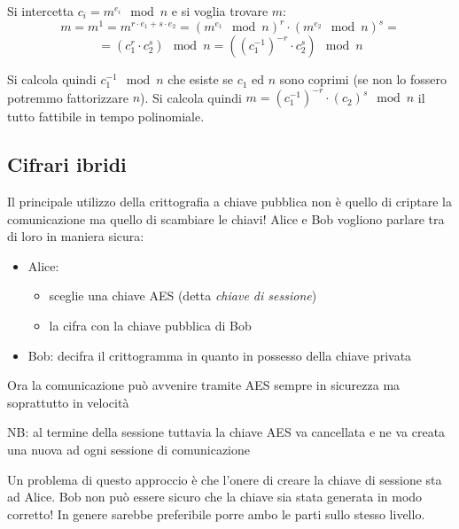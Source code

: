 Si intercetta $c_i = m^{e_i} \mod n$ e si voglia trovare $m$:
$$ m = m^1 = m^{r \cdot e_1 + s \cdot e_2 } = (m^{e_1} \mod n)^{r} \cdot (m^{e_2} \mod n)^{s} = $$
$$ = (c_1^r \cdot c_2^s) \mod n = ((c_1^{-1})^{-r} \cdot c_2^s) \mod n $$

Si calcola quindi $c_1^{-1} \mod n$ che esiste se $c_1$ ed $n$ sono coprimi (se non lo fossero potremmo fattorizzare $n$). Si calcola quindi $m = (c_1^{-1})^{-r} \cdot (c_2)^{s} \mod n$ il tutto fattibile in tempo polinomiale.

\subsection{Cifrari ibridi}
Il principale utilizzo della crittografia a chiave pubblica non è quello di criptare la comunicazione ma quello di scambiare le chiavi! Alice e Bob vogliono parlare tra di loro in maniera sicura:
\begin{itemize}
    \item Alice: 
    \begin{itemize}
        \item sceglie una chiave AES (detta \emph{chiave di sessione})
        \item la cifra con la chiave pubblica di Bob
    \end{itemize}
    \item Bob: decifra il crittogramma in quanto in possesso della chiave privata
\end{itemize}
Ora la comunicazione può avvenire tramite AES sempre in sicurezza ma soprattutto in velocità

NB: al termine della sessione tuttavia la chiave AES va cancellata e ne va creata una nuova ad ogni sessione di comunicazione

Un problema di questo approccio è che l'onere di creare la chiave di sessione sta ad Alice. Bob non può essere sicuro che la chiave sia stata generata in modo corretto!
In genere sarebbe preferibile porre ambo le parti sullo stesso livello.